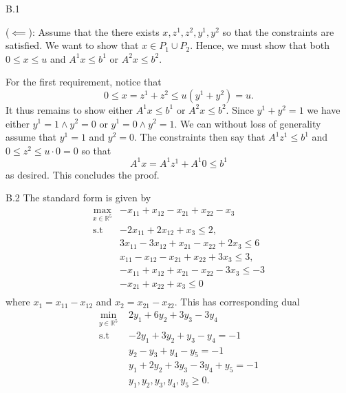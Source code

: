 \documentclass[a4paper]{article}
\begin{document}
\begin{exercise}{B.1}
\begin{enumerate}[label=(\roman*)]
        ($ \impliedby $): Assume that the there exists $ x,z^{1},z^{2},y^{1},y^{2} $ so that the constraints are satisfied. We want to show that $ x \in P_1 \cup P_2 $. Hence, we must show that both $ 0 \leq x \leq u $ and
        $ A^{1}x \leq b^{1} $ or $ A^{2}x \leq b^{2} $.

        For the first requirement, notice that
        \begin{equation*}
        0 \leq x = z^{1} + z^{2} \leq u(y^{1} + y^{2}) =u
        .\end{equation*}
        It thus remains to show either $ A^{1}x \leq b^{1} $ or $ A^{2}x \leq b^{2} $. Since $ y^{1} + y^{2} = 1 $ we have either $ y^{1} = 1 \land y^{2} = 0 $ or $ y^{1} = 0 \land y^{2} = 1 $. We can without loss of generality assume that $ y^{1} = 1 $ and $ y^{2} = 0 $. The constraints then say that $ A^{1}z^{1} \leq b^{1} $ and $ 0 \leq z^{2} \leq u\cdot 0 = 0 $ so that
        \begin{equation*}
        A^{1}x = A^{1}z^{1} + A^{1}0 \leq b^{1}
        \end{equation*}
        as desired. This concludes the proof.
    \end{enumerate}
  \end{exercise}

  \begin{exercise}{B.2}
    The standard form is given by
    \begin{align*}
      \max_{x \in \mathbb{R}^{5}} &-x_{11} + x_{12} - x_{21} + x_{22} - x_3 \\
      \text{s.t } &-2x_{11} + 2x_{12} + x_3 \leq 2, \\
                  &3x_{11} - 3x_{12} + x_{21} - x_{22} + 2x_3 \leq 6 \\
                 &x_{11} - x_{12} - x_{21} + x_{22} + 3x_3 \leq 3, \\
                 &-x_{11} + x_{12} + x_{21} - x_{22} -3x_3 \leq -3 \\
                 & -x_{21} + x_{22} + x_3 \leq 0 \\
    \end{align*}
    where $ x_1 = x_{11} - x_{12} $ and $ x_2 = x_{21} - x_{22} $. This has corresponding dual
    \begin{align*}
      \min_{y \in \mathbb{R}^{5}}\,\, &2y_1 + 6y_2 + 3y_3 - 3y_4 \\
      \text{s.t } & -2y_1 + 3y_2 + y_3 - y_4 = -1 \\
                  & y_2 - y_3 + y_4 - y_5 = -1 \\
                  & y_1 + 2y_2 + 3y_3 - 3y_4 + y_5 = -1 \\
                  & y_1, y_2, y_3, y_4, y_5 \geq 0.
    \end{align*}
  \end{exercise}
\end{document}
